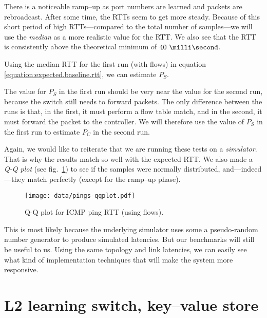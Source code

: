 

There is a noticeable ramp--up as port numbers are learned and packets are
rebroadcast.  After some time, the RTTs seem to get more steady.
Because of this short period of high RTTs---compared to the total number of
samples---we will use the \textit{median} as a more realistic value for the
RTT. We also see that the RTT is consistently above the theoretical minimum
of $\ms{40}$.

Using the median RTT for the first run (with flows)
in equation \ref{equation:expected.baseline.rtt}, we can estimate $P_S$.



The value for $P_S$ in the first run should be very near the value for the
second run, because the switch still needs to forward packets.  The only
difference between the runs is that, in the first, it must perform a flow
table match, and in the second, it must forward the packet to the
controller.  We will therefore use the value of $P_S$ in the first run to
estimate $P_C$ in the second run.



Again, we would like to reiterate that we are running these tests on a
\textit{simulator}.  That is why the results match so well with the expected
\acs{RTT}.  We also made a \textit{Q-Q plot} (see fig.~\ref{figure:pings.qqplot}) to see if the samples were
normally distributed, and---indeed---they match perfectly (except for the
ramp--up phase).

\begin{figure}
  \centering
  \texttt{[image: data/pings-qqplot.pdf]}
  \caption{Q-Q plot for ICMP ping RTT (using flows).}
  \label{figure:pings.qqplot}
\end{figure}

This is most likely because the
underlying simulator uses some a pseudo-random number generator to
produce simulated latencies.  But our benchmarks will still be useful to us.
Using the same topology and link latencies, we can easily see what kind of
implementation techniques that will make the system more responsive.

\section{L2 learning switch, key--value store}
\label{chapter:benchmark.l2.kv.noflows}

